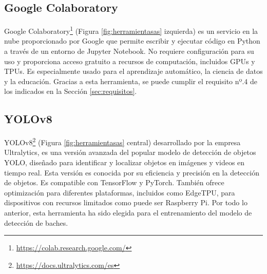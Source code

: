 \subsection{Google Colaboratory}
\label{subsec:googlecolab}

Google Colaboratory\footnote{\url{https://colab.research.google.com/}} (Figura \ref{fig:herramientasas} izquierda) es un servicio en la nube proporcionado por Google que permite escribir y ejecutar código en Python a través de un entorno de Jupyter Notebook. No requiere configuración para su uso y proporciona acceso gratuito a recursos de computación, incluidos GPUs y TPUs. Es especialmente usado para el aprendizaje automático, la ciencia de datos y la educación. Gracias a esta herramienta, se puede cumplir el requisito nº.4 de los indicados en la Sección \ref{sec:requisitos}.


\subsection{YOLOv8}
\label{subsec:yolov8}

\acs{YOLO}v8\footnote{\url{https://docs.ultralytics.com/es}} (Figura \ref{fig:herramientasas} central) desarrollado por la empresa Ultralytics, es una versión avanzada del popular modelo de detección de objetos \ac{YOLO}, diseñado para identificar y localizar objetos en imágenes y videos en tiempo real. Esta versión es conocida por su eficiencia y precisión en la detección de objetos. Es compatible con TensorFlow y PyTorch. También ofrece optimización para diferentes plataformas, incluidos como EdgeTPU, para dispositivos con recursos limitados como puede ser Raspberry Pi. Por todo lo anterior, esta herramienta ha sido elegida para el entrenamiento del modelo de detección de baches. 



